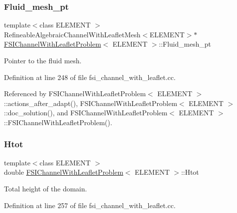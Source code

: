 \subsubsection{\texorpdfstring{Fluid\+\_\+mesh\+\_\+pt}{Fluid\_mesh\_pt}}
{\footnotesize\ttfamily template$<$class E\+L\+E\+M\+E\+NT $>$ \\
Refineable\+Algebraic\+Channel\+With\+Leaflet\+Mesh$<$E\+L\+E\+M\+E\+NT$>$$\ast$ \hyperlink{classFSIChannelWithLeafletProblem}{F\+S\+I\+Channel\+With\+Leaflet\+Problem}$<$ E\+L\+E\+M\+E\+NT $>$\+::Fluid\+\_\+mesh\+\_\+pt\hspace{0.3cm}{\ttfamily [private]}}



Pointer to the fluid mesh. 



Definition at line 248 of file fsi\+\_\+channel\+\_\+with\+\_\+leaflet.\+cc.



Referenced by F\+S\+I\+Channel\+With\+Leaflet\+Problem$<$ E\+L\+E\+M\+E\+N\+T $>$\+::actions\+\_\+after\+\_\+adapt(), F\+S\+I\+Channel\+With\+Leaflet\+Problem$<$ E\+L\+E\+M\+E\+N\+T $>$\+::doc\+\_\+solution(), and F\+S\+I\+Channel\+With\+Leaflet\+Problem$<$ E\+L\+E\+M\+E\+N\+T $>$\+::\+F\+S\+I\+Channel\+With\+Leaflet\+Problem().

\mbox{\label{classFSIChannelWithLeafletProblem_a765a35c452989fa2d54bc1441d04925c}} 
\subsubsection{\texorpdfstring{Htot}{Htot}}
{\footnotesize\ttfamily template$<$class E\+L\+E\+M\+E\+NT $>$ \\
double \hyperlink{classFSIChannelWithLeafletProblem}{F\+S\+I\+Channel\+With\+Leaflet\+Problem}$<$ E\+L\+E\+M\+E\+NT $>$\+::Htot\hspace{0.3cm}{\ttfamily [private]}}



Total height of the domain. 



Definition at line 257 of file fsi\+\_\+channel\+\_\+with\+\_\+leaflet.\+cc.

\mbox{\label{classFSIChannelWithLeafletProblem_ade82d11fc4bdd54b848f02361f8cc99e}} 

